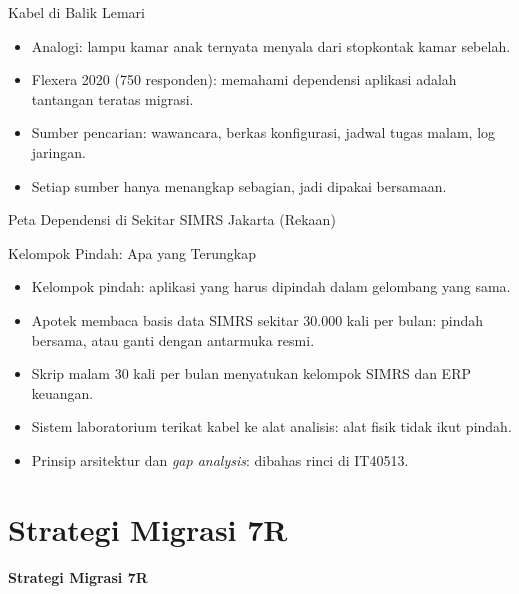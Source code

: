 \documentclass[aspectratio=169, table, 12pt]{beamer}
\begin{document}
\begin{frame}{Kabel di Balik Lemari}
  \begin{itemize}
    \item Analogi: lampu kamar anak ternyata menyala dari stopkontak kamar sebelah.
    \item Flexera 2020 (750 responden): memahami dependensi aplikasi adalah tantangan
          teratas migrasi.
    \item Sumber pencarian: wawancara, berkas konfigurasi, jadwal tugas malam, log
          jaringan.
    \item Setiap sumber hanya menangkap sebagian, jadi dipakai bersamaan.
  \end{itemize}
\end{frame}

\begin{frame}{Peta Dependensi di Sekitar SIMRS Jakarta (Rekaan)}
  \centering
\end{frame}

\begin{frame}{Kelompok Pindah: Apa yang Terungkap}
  \begin{itemize}
    \item Kelompok pindah: aplikasi yang harus dipindah dalam gelombang yang sama.
    \item Apotek membaca basis data SIMRS sekitar 30.000 kali per bulan: pindah bersama,
          atau ganti dengan antarmuka resmi.
    \item Skrip malam 30 kali per bulan menyatukan kelompok SIMRS dan ERP keuangan.
    \item Sistem laboratorium terikat kabel ke alat analisis: alat fisik tidak ikut
          pindah.
    \item Prinsip arsitektur dan \textit{gap analysis}: dibahas rinci di IT40513.
  \end{itemize}
\end{frame}

\section{Strategi Migrasi 7R}

\begin{frame}{\hfill}
  \centering
  \Huge{\textbf{Strategi Migrasi 7R}}
\end{frame}
\end{document}
